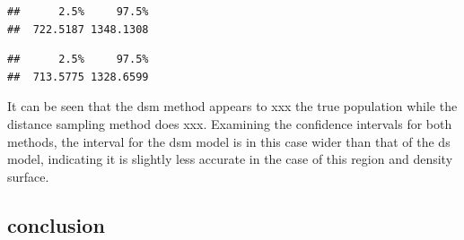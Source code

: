\documentclass[
]{article}
\newenvironment{Shaded}{\begin{snugshade}}{\end{snugshade}}
\newcommand{\FloatTok}[1]{\textcolor[rgb]{0.00,0.00,0.81}{#1}}
\newcommand{\FunctionTok}[1]{\textcolor[rgb]{0.00,0.00,0.00}{#1}}
\newcommand{\NormalTok}[1]{#1}
\newcommand{\SpecialCharTok}[1]{\textcolor[rgb]{0.00,0.00,0.00}{#1}}
\begin{document}
\begin{Shaded}
\end{Shaded}

\begin{verbatim}
##      2.5%     97.5% 
##  722.5187 1348.1308
\end{verbatim}

\begin{Shaded}
\end{Shaded}

\begin{verbatim}
##      2.5%     97.5% 
##  713.5775 1328.6599
\end{verbatim}

It can be seen that the dsm method appears to xxx the true population
while the distance sampling method does xxx. Examining the confidence
intervals for both methods, the interval for the dsm model is in this
case wider than that of the ds model, indicating it is slightly less
accurate in the case of this region and density surface.

\hypertarget{conclusion}{%
\subsection{conclusion}\label{conclusion}}
\end{document}
